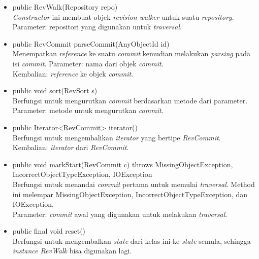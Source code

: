 \begin{itemize}
\item public RevWalk(Repository repo)\\
\textit{Constructor} ini membuat objek \textit{revision walker} untuk suatu \textit{repository}.\\
Parameter: repositori yang digunakan untuk \textit{traversal}.  

\item public RevCommit parseCommit(AnyObjectId id)\\
Menempatkan \textit{reference} ke suatu \textit{commit} kemudian melakukan \textit{parsing} pada isi \textit{commit}.
Parameter: nama dari objek \textit{commit}.\\
Kembalian: \textit{reference} ke objek \textit{commit}.

\item public void sort(RevSort s)\\
Berfungsi untuk mengurutkan \textit{commit} berdasarkan metode dari parameter.\\
Parameter: metode untuk mengurutkan \textit{commit}.

\item public Iterator<RevCommit> iterator()\\
Berfungsi untuk mengembalikan \textit{iterator} yang bertipe \textit{RevCommit}.\\
Kembalian: \textit{iterator} dari \textit{RevCommit}.

\item public void markStart(RevCommit c) throws MissingObjectException, IncorrectObjectTypeException, IOException\\
Berfungsi untuk menandai \textit{commit} pertama untuk memulai \textit{traversal}. Method ini melempar MissingObjectException, IncorrectObjectTypeException, dan IOException.\\
Parameter: \textit{commit} awal yang digunakan untuk melakukan \textit{traversal}.

\item public final void reset()\\
Berfungsi untuk mengembalkan \textit{state} dari kelas ini ke \textit{state} semula, sehingga \textit{instance RevWalk} bisa digunakan lagi.
\end{itemize}

